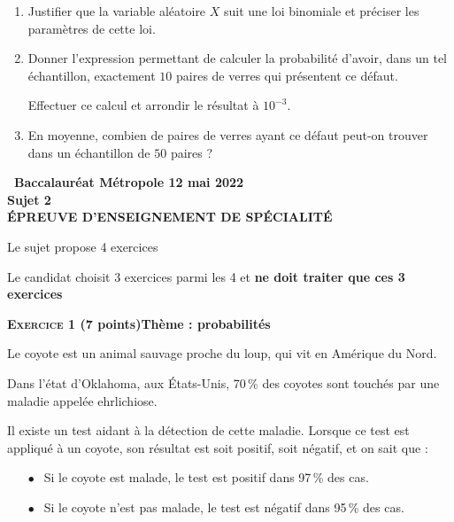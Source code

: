 \documentclass[10pt,a4paper]{article}
\begin{document}
\medskip

\begin{enumerate}
\item Justifier que la variable aléatoire $X$ suit une loi binomiale et préciser les paramètres de cette loi.
\item Donner l'expression permettant de calculer la probabilité d'avoir, dans un tel échantillon, exactement $10$ paires de verres qui présentent ce défaut. 

Effectuer ce calcul et arrondir le résultat à $10^{-3}$.
\item En moyenne, combien de paires de verres ayant ce défaut peut-on trouver dans un échantillon de $50$ paires ?
\end{enumerate}

\newpage
\hypertarget{Metropole2}{}

\label{Metropole2}

\pagestyle{fancy}
\thispagestyle{empty}

\begin{center}{\Large\textbf{\decofourleft~Baccalauréat Métropole 12 mai 2022~\decofourright\\[6pt]  Sujet 2\\[7pt] ÉPREUVE D'ENSEIGNEMENT DE SPÉCIALITÉ}}
\end{center}

\vspace{0,25cm}

Le sujet propose 4 exercices

Le candidat choisit 3 exercices parmi les 4 et \textbf{ne doit traiter que ces 3 exercices}

\bigskip

\textbf{\textsc{Exercice 1} \quad (7 points)\hfill Thème : probabilités}

\medskip

Le coyote est un animal sauvage proche du loup, qui vit en Amérique du Nord.

Dans l'état d'Oklahoma, aux États-Unis, 70\,\% des coyotes sont touchés par une maladie appelée ehrlichiose.

Il existe un test aidant à la détection de cette maladie. Lorsque ce test est appliqué à un coyote, son résultat est soit positif, soit négatif, et on sait que :

\setlength\parindent{1cm}
\begin{itemize}
\item[$\bullet~~$] Si le coyote est malade, le test est positif dans 97\,\% des cas.
\item[$\bullet~~$] Si le coyote n'est pas malade, le test est négatif dans 95\,\% des cas.
\end{itemize}
\setlength\parindent{0cm}
\end{document}
